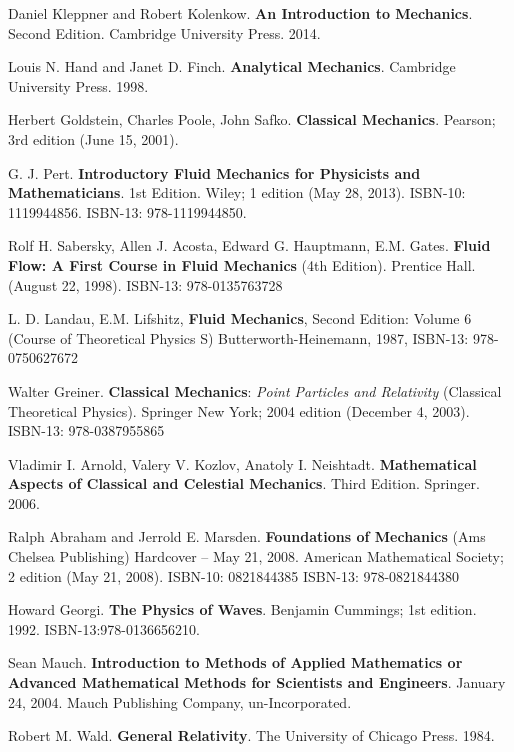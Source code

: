 Daniel Kleppner and Robert Kolenkow. \textbf{An Introduction to Mechanics}. Second Edition. Cambridge University Press. 2014.

Louis N. Hand and Janet D. Finch. \textbf{Analytical Mechanics}. Cambridge University Press. 1998. 

Herbert Goldstein, Charles Poole, John Safko. \textbf{Classical Mechanics}. Pearson; 3rd edition (June 15, 2001).

G. J. Pert. \textbf{Introductory Fluid Mechanics for Physicists and Mathematicians}. 1st Edition. Wiley; 1 edition (May 28, 2013). ISBN-10: 1119944856. ISBN-13: 978-1119944850. 

Rolf H. Sabersky, Allen J. Acosta, Edward G. Hauptmann, E.M. Gates.  \textbf{Fluid Flow: A First Course in Fluid Mechanics} (4th Edition).  Prentice Hall. (August 22, 1998).  ISBN-13: 978-0135763728

L. D. Landau, E.M. Lifshitz, \textbf{Fluid Mechanics}, Second Edition: Volume 6 (Course of Theoretical Physics S) Butterworth-Heinemann, 1987, ISBN-13: 978-0750627672


Walter Greiner. \textbf{Classical Mechanics}: \emph{Point Particles and Relativity} (Classical Theoretical Physics). Springer New York; 2004 edition (December 4, 2003). ISBN-13: 978-0387955865

Vladimir I. Arnold, Valery V. Kozlov, Anatoly I. Neishtadt.  \textbf{Mathematical Aspects of Classical and Celestial Mechanics}.  Third Edition.  Springer. 2006.  

Ralph Abraham and Jerrold E. Marsden. 
\textbf{Foundations of Mechanics} (Ams Chelsea Publishing) Hardcover – May 21, 2008.  American Mathematical Society; 2 edition (May 21, 2008). ISBN-10: 0821844385
ISBN-13: 978-0821844380

Howard Georgi. \textbf{The Physics of Waves}. Benjamin Cummings; 1st edition. 1992. ISBN-13:978-0136656210.

Sean Mauch. \textbf{Introduction to Methods of Applied Mathematics or Advanced Mathematical Methods for Scientists and Engineers}. January 24, 2004. Mauch Publishing Company, un-Incorporated. 

Robert M. Wald. \textbf{General Relativity}. The University of Chicago Press. 1984.


